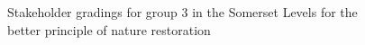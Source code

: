 \documentclass[
  12pt,
  letterpaper,
  DIV=11,
  numbers=noendperiod]{scrartcl}
\begin{document}
\begin{figure}[H]


\caption{\label{fig-SomBetterG3}Stakeholder gradings for group 3 in the
Somerset Levels for the better principle of nature restoration}

\end{figure}%
\end{document}

